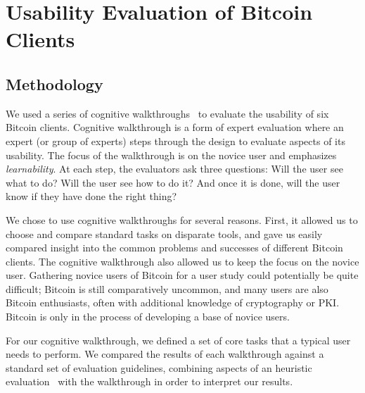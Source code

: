 
\section{Usability Evaluation of Bitcoin Clients}

\subsection{Methodology}

We used a series of cognitive walkthroughs~\cite{WRLP94} to evaluate the usability of six Bitcoin clients. Cognitive walkthrough is a form of expert evaluation where an expert (or group of experts) steps through the design to evaluate aspects of its usability. The focus of the walkthrough is on the novice user and emphasizes \emph{learnability}. At each step, the evaluators ask three questions: Will the user see what to do? Will the user see how to do it? And once it is done, will the user know if they have done the right thing?

We chose to use cognitive walkthroughs for several reasons. First, it allowed us to choose and compare standard tasks on disparate tools, and gave us easily compared insight into the common problems and successes of different Bitcoin clients. The cognitive walkthrough also allowed us to keep the focus on the novice user. Gathering novice users of Bitcoin for a user study could potentially be quite difficult; Bitcoin is still comparatively uncommon, and many users are also Bitcoin enthusiasts, often with additional knowledge of cryptography or PKI. Bitcoin is only in the process of developing a base of novice users. %


For our cognitive walkthrough, we defined a set of core tasks that a typical user needs to perform. We compared the results of each walkthrough against a standard set of evaluation guidelines, combining aspects of an heuristic evaluation~\cite{HeuristicEvaluation} with the walkthrough in order to interpret our results. 


